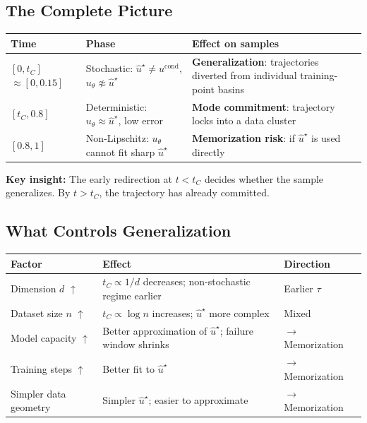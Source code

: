 \documentclass[11pt, a4paper]{article}
\theoremstyle{plain}
\theoremstyle{definition}
\theoremstyle{remark}
\begin{document}
\subsection{The Complete Picture}

\begin{tcolorbox}[colback=lightgray,colframe=darkgray,arc=4pt,title={\textbf{Flow Trajectory Timeline ($t \in [0,1]$)}},fonttitle=\bfseries]
\begin{center}
\renewcommand{\arraystretch}{1.4}
\begin{tabular}{p{3cm}p{6cm}p{4cm}}
\toprule
\textbf{Time} & \textbf{Phase} & \textbf{Effect on samples} \\
\midrule
$[0, t_C]$ $\approx [0, 0.15]$ & Stochastic: $\hat{u}^\star \neq u^{\mathrm{cond}}$, $u_\theta \not\approx \hat{u}^\star$ & \textbf{Generalization}: trajectories diverted from individual training-point basins \\
$[t_C, 0.8]$ & Deterministic: $u_\theta \approx \hat{u}^\star$, low error & \textbf{Mode commitment}: trajectory locks into a data cluster \\
$[0.8, 1]$ & Non-Lipschitz: $u_\theta$ cannot fit sharp $\hat{u}^\star$ & \textbf{Memorization risk}: if $\hat{u}^\star$ is used directly \\
\bottomrule
\end{tabular}
\end{center}
\vspace{6pt}
\textbf{Key insight:} The early redirection at $t < t_C$ decides whether the sample generalizes. By $t > t_C$, the trajectory has already committed.
\end{tcolorbox}

\subsection{What Controls Generalization}

\begin{center}
\renewcommand{\arraystretch}{1.3}
\begin{tabularx}{\textwidth}{lXl}
\toprule
\textbf{Factor} & \textbf{Effect} & \textbf{Direction} \\
\midrule
Dimension $d$ $\uparrow$ & $t_C \propto 1/d$ decreases; non-stochastic regime earlier & Earlier $\tau$ \\
Dataset size $n$ $\uparrow$ & $t_C \propto \log n$ increases; $\hat{u}^\star$ more complex & Mixed \\
Model capacity $\uparrow$ & Better approximation of $\hat{u}^\star$; failure window shrinks & $\to$ Memorization \\
Training steps $\uparrow$ & Better fit to $\hat{u}^\star$ & $\to$ Memorization \\
Simpler data geometry & Simpler $\hat{u}^\star$; easier to approximate & $\to$ Memorization \\
\bottomrule
\end{tabularx}
\end{center}
\end{document}
